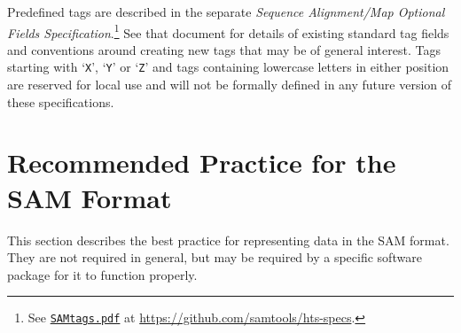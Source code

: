 \documentclass[10pt]{article}
\begin{document}
Predefined tags are described in the separate {\sl Sequence Alignment/Map
Optional Fields Specification}.\footnote{See
\href{http://samtools.github.io/hts-specs/SAMtags.pdf}{\tt SAMtags.pdf}
at \url{https://github.com/samtools/hts-specs}.}
See that document for details of existing standard tag fields and conventions
around creating new tags that may be of general interest.
Tags starting with `{\tt X}', `{\tt Y}' or `{\tt Z}' and tags containing
lowercase letters in either position are reserved for local use and will
not be formally defined in any future version of these specifications.

\pagebreak

\section{Recommended Practice for the SAM Format}
\label{sec:recommended-practice}
This section describes the best practice for representing data in the
SAM format. They are not required in general, but may be required by a
specific software package for it to function properly.
\end{document}
